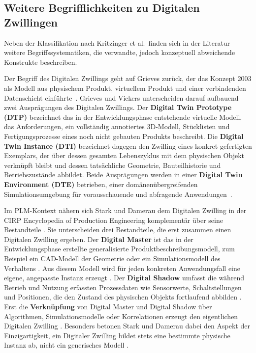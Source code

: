 \subsection{Weitere Begrifflichkeiten zu Digitalen Zwillingen}
Neben der Klassifikation nach Kritzinger et al.\ finden sich in der Literatur weitere
Begriffssystematiken, die verwandte, jedoch konzeptuell abweichende Konstrukte
beschreiben.

Der Begriff des Digitalen Zwillings geht auf Grieves zurück, der das Konzept 2003 als Modell aus physischem Produkt, virtuellem Produkt und einer verbindenden Datenschicht einführte~\cite{grieves2014}.
Grieves und Vickers unterscheiden darauf aufbauend zwei Ausprägungen des Digitalen Zwillings.
Der \textbf{Digital Twin Prototype (DTP)} bezeichnet das in der Entwicklungsphase
entstehende virtuelle Modell, das Anforderungen, ein vollständig annotiertes 3D-Modell,
Stücklisten und Fertigungsprozesse eines noch nicht gebauten Produkts beschreibt.
Die \textbf{Digital Twin Instance (DTI)} bezeichnet dagegen den Zwilling eines konkret
gefertigten Exemplars, der über dessen gesamten Lebenszyklus mit dem physischen Objekt
verknüpft bleibt und dessen tatsächliche Geometrie, Bauteilhistorie und
Betriebszustände abbildet.
Beide Ausprägungen werden in einer \textbf{Digital Twin Environment (DTE)} betrieben,
einer domänenübergreifenden Simulationsumgebung für vorausschauende und abfragende
Anwendungen~\cite{Grieves2017}.

Im PLM-Kontext nähern sich Stark und Damerau dem Digitalen Zwilling in der CIRP
Encyclopedia of Production Engineering komplementär über seine Bestandteile
\cite{stark2019}.
Sie unterscheiden drei Bestandteile, die erst zusammen einen Digitalen Zwilling
ergeben.
Der \textbf{Digital Master} ist das in der Entwicklungsphase erstellte generalisierte
Produktbeschreibungsmodell, zum Beispiel ein CAD-Modell der Geometrie oder ein
Simulationsmodell des Verhaltens \cite{stark2019}.
Aus diesem Modell wird für jeden konkreten Anwendungsfall eine eigene, angepasste
Instanz erzeugt \cite{stark2019}.
Der \textbf{Digital Shadow} umfasst die während Betrieb und Nutzung erfassten
Prozessdaten wie Sensorwerte, Schaltstellungen und Positionen, die den Zustand des
physischen Objekts fortlaufend abbilden \cite{stark2019}.
Erst die \textbf{Verknüpfung} von Digital Master und Digital Shadow über Algorithmen,
Simulationsmodelle oder Korrelationen erzeugt den eigentlichen Digitalen Zwilling
\cite{stark2019}.
Besonders betonen Stark und Damerau dabei den Aspekt der Einzigartigkeit, ein
Digitaler Zwilling bildet stets eine bestimmte physische Instanz ab, nicht ein
generisches Modell \cite{stark2019}.

